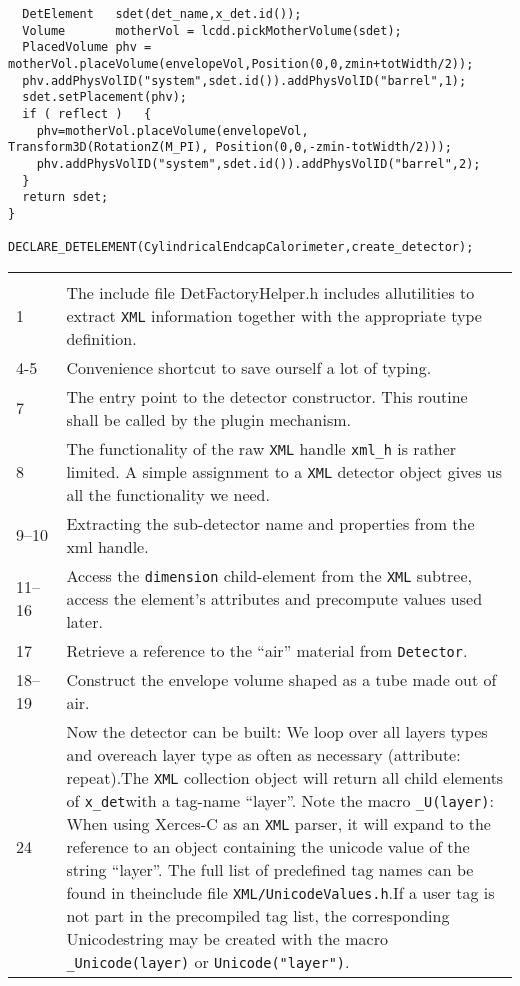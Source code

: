 \begin{verbatim}
  DetElement   sdet(det_name,x_det.id());
  Volume       motherVol = lcdd.pickMotherVolume(sdet);
  PlacedVolume phv = motherVol.placeVolume(envelopeVol,Position(0,0,zmin+totWidth/2));
  phv.addPhysVolID("system",sdet.id()).addPhysVolID("barrel",1);
  sdet.setPlacement(phv);
  if ( reflect )   {
    phv=motherVol.placeVolume(envelopeVol, Transform3D(RotationZ(M_PI), Position(0,0,-zmin-totWidth/2)));
    phv.addPhysVolID("system",sdet.id()).addPhysVolID("barrel",2);
  }
  return sdet;
}

DECLARE_DETELEMENT(CylindricalEndcapCalorimeter,create_detector);
\end{verbatim}
{\small
\begin{tabular} {p{0.1\linewidth}|p{0.9\linewidth}}
\hline \\
1 & The include file DetFactoryHelper.h includes allutilities to extract \texttt{XML} information together with the appropriate type definition.\\
4-5 & Convenience shortcut to save ourself a lot of typing.\\
7 & The entry point to the detector constructor. This routine shall be called by the plugin mechanism.\\
8 & The functionality of the raw \texttt{XML} handle \texttt{xml\_h} is rather limited. A simple assignment to a \texttt{XML} detector object gives us all the functionality we need.\\
9--10 & Extracting the sub-detector name and properties from the xml handle.\\
11--16 & Access the \texttt{dimension} child-element from the \texttt{XML} subtree, access the element's attributes and precompute values used later.\\
17 & Retrieve a reference to the ``air'' material from \texttt{Detector}.\\
18--19 & Construct the envelope volume shaped as a tube made out of air.\\
24 & Now the detector can be built: We loop over all layers types and overeach layer type as often as necessary (attribute: repeat).The \texttt{XML} collection object will return all child elements of \texttt{x\_det}with a tag-name ``layer''.  Note the macro \texttt{\_U(layer)}: When using Xerces-C as an \texttt{XML} parser, it will expand to the reference to an object containing the unicode value of the string ``layer''. The full list of predefined tag names can be found in theinclude file \texttt{XML/UnicodeValues.h}.If a user tag is not part in the precompiled tag list, the corresponding Unicodestring may be created with the macro \texttt{\_Unicode(layer)} or \texttt{Unicode("layer")}.\\

\end{tabular}}
